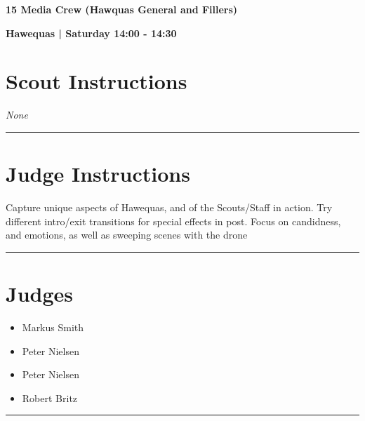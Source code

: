 \documentclass[10pt]{article}
\newcommand{\newtitle}[1]{\begin{center}{\Huge\bfseries #1 }\\ \vspace{5mm}\end{center}}
\newcommand{\newsubtitle}[1]{\begin{center}{\color{grey}\Large\bfseries #1 }\\ \vspace{5mm}\end{center}}
\begin{document}
	\vspace{1cm}


	\clearpage
		\newtitle{15 Media Crew (Hawquas General and Fillers) }
	\newsubtitle{Hawequas | Saturday 14:00 - 14:30}
		\setcounter{section}{14}
	\section*{Scout Instructions}
		\textit{None}
	
	\vspace{0.5cm}
	\hrule
	\vspace{0.5cm}

		\section*{Judge Instructions}
		Capture unique aspects of Hawequas, and of the Scouts/Staff in action. Try different intro/exit transitions for special effects in post. Focus on candidness, and emotions, as well as sweeping scenes with the drone
\vspace{0.5cm}
	\hrule
	\vspace{0.5cm}
		\section*{\faUsers \: Judges}

		

	\begin{multicols}{2}

		\begin{itemize}
									\item Markus Smith
									\item Peter Nielsen
						\end{itemize}

		\vfill\null
		\columnbreak

		\begin{itemize}
									\item Peter Nielsen
									\item Robert Britz
						\end{itemize}

		\vfill\null

		\end{multicols}



			\vspace{0.5cm}
	\hrule
	\vspace{0.5cm}
\end{document}
